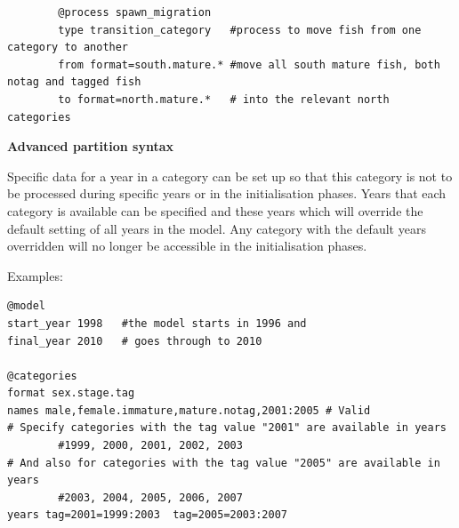 {\small{\begin{verbatim}
		@process spawn_migration
		type transition_category   #process to move fish from one category to another
		from format=south.mature.* #move all south mature fish, both notag and tagged fish  
		to format=north.mature.*   # into the relevant north categories
\end{verbatim}}}

\textbf{Advanced partition syntax}

Specific data for a year in a category can be set up so that this category is not to be processed during specific years or in the initialisation phases. Years that each category is available can be specified and these years which will override the default setting of all years in the model. Any category with the default years overridden will no longer be accessible in the initialisation phases.

Examples:

{\small{\begin{verbatim}
@model
start_year 1998   #the model starts in 1996 and
final_year 2010   # goes through to 2010

@categories
format sex.stage.tag
names male,female.immature,mature.notag,2001:2005 # Valid
# Specify categories with the tag value "2001" are available in years 
        #1999, 2000, 2001, 2002, 2003
# And also for categories with the tag value "2005" are available in years 
        #2003, 2004, 2005, 2006, 2007
years tag=2001=1999:2003  tag=2005=2003:2007
\end{verbatim}}}

